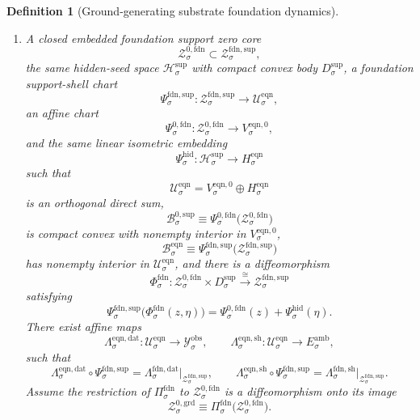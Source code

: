 \documentclass[11pt]{article}
\newcommand{\DataSpace}[1]{\mathcal Y_{#1}^{\mathrm{obs}}}
\newcommand{\AmbientTarget}[1]{E_{#1}^{\mathrm{amb}}}
\newcommand{\SeedHidden}[1]{\mathcal H_{#1}^{\mathrm{sup}}}
\newcommand{\SeedHiddenBody}[1]{D_{#1}^{\mathrm{sup}}}
\newcommand{\HiddenChart}[1]{\Psi_{#1}^{\mathrm{hid}}}
\newcommand{\ZeroBody}[1]{\mathcal B_{#1}^{0,\mathrm{sup}}}
\newcommand{\GroundZeroCore}[1]{\mathcal Z_{#1}^{0,\mathrm{grd}}}
\newcommand{\FoundProj}[1]{\Pi_{#1}^{\mathrm{fdn}}}
\newcommand{\FoundData}[1]{\Lambda_{#1}^{\mathrm{fdn,dat}}}
\newcommand{\FoundShellMap}[1]{\Lambda_{#1}^{\mathrm{fdn,sh}}}
\newcommand{\FoundSupportShell}[1]{\mathcal Z_{#1}^{\mathrm{fdn,sup}}}
\newcommand{\FoundZeroCore}[1]{\mathcal Z_{#1}^{0,\mathrm{fdn}}}
\newcommand{\FoundEqChart}[1]{\Psi_{#1}^{\mathrm{fdn,sup}}}
\newcommand{\FoundZeroChart}[1]{\Psi_{#1}^{0,\mathrm{fdn}}}
\newcommand{\FoundSplit}[1]{\Phi_{#1}^{\mathrm{fdn}}}
\newcommand{\EqnSpace}[1]{\mathcal U_{#1}^{\mathrm{eqn}}}
\newcommand{\EqnData}[1]{\Lambda_{#1}^{\mathrm{eqn,dat}}}
\newcommand{\EqnShell}[1]{\Lambda_{#1}^{\mathrm{eqn,sh}}}
\newcommand{\EqnHidden}[1]{H_{#1}^{\mathrm{eqn}}}
\newcommand{\EqnZero}[1]{V_{#1}^{\mathrm{eqn},0}}
\newcommand{\EqnBody}[1]{\mathcal B_{#1}^{\mathrm{eqn}}}
\newtheorem{definition}{Definition}
\begin{document}
\begin{definition}[Ground-generating substrate foundation dynamics]
\begin{enumerate}
    \item A closed embedded foundation support zero core
    \[
    \FoundZeroCore{\sigma}\subset\FoundSupportShell{\sigma},
    \]
    the same hidden-seed space \(\SeedHidden{\sigma}\) with compact convex body \(\SeedHiddenBody{\sigma}\), a foundation support-shell chart
    \[
    \FoundEqChart{\sigma}:\FoundSupportShell{\sigma}\to\EqnSpace{\sigma},
    \]
    an affine chart
    \[
    \FoundZeroChart{\sigma}:\FoundZeroCore{\sigma}\to\EqnZero{\sigma},
    \]
    and the same linear isometric embedding
    \[
    \HiddenChart{\sigma}:\SeedHidden{\sigma}\to\EqnHidden{\sigma}
    \]
    such that
    \[
    \EqnSpace{\sigma}
    =
    \EqnZero{\sigma}\oplus\EqnHidden{\sigma}
    \]
    is an orthogonal direct sum,
    \[
    \ZeroBody{\sigma}
    \equiv
    \FoundZeroChart{\sigma}\bigl(\FoundZeroCore{\sigma}\bigr)
    \]
    is compact convex with nonempty interior in \(\EqnZero{\sigma}\),
    \[
    \EqnBody{\sigma}
    \equiv
    \FoundEqChart{\sigma}\bigl(\FoundSupportShell{\sigma}\bigr)
    \]
    has nonempty interior in \(\EqnSpace{\sigma}\), and there is a diffeomorphism
    \begin{equation}
    \FoundSplit{\sigma}:
    \FoundZeroCore{\sigma}\times\SeedHiddenBody{\sigma}
    \xrightarrow{\cong}
    \FoundSupportShell{\sigma}
    \label{eq:foundsplit}
    \end{equation}
    satisfying
    \begin{equation}
    \FoundEqChart{\sigma}\bigl(\FoundSplit{\sigma}(z,\eta)\bigr)
    =
    \FoundZeroChart{\sigma}(z)+\HiddenChart{\sigma}(\eta).
    \label{eq:foundchartsplit}
    \end{equation}
    There exist affine maps
    \[
    \EqnData{\sigma}:\EqnSpace{\sigma}\to\DataSpace{\sigma},
    \qquad
    \EqnShell{\sigma}:\EqnSpace{\sigma}\to\AmbientTarget{\sigma},
    \]
    such that
    \begin{equation}
    \EqnData{\sigma}\circ\FoundEqChart{\sigma}
    =
    \FoundData{\sigma}\big|_{\FoundSupportShell{\sigma}},
    \qquad
    \EqnShell{\sigma}\circ\FoundEqChart{\sigma}
    =
    \FoundShellMap{\sigma}\big|_{\FoundSupportShell{\sigma}}.
    \label{eq:foundeqnchartreadouts}
    \end{equation}
    Assume the restriction of \(\FoundProj{\sigma}\) to \(\FoundZeroCore{\sigma}\) is a diffeomorphism onto its image
    \[
    \GroundZeroCore{\sigma}
    \equiv
    \FoundProj{\sigma}\bigl(\FoundZeroCore{\sigma}\bigr).
    \]


\end{enumerate}
\end{definition}
\end{document}
